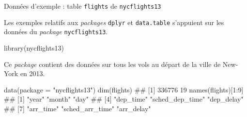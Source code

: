 \documentclass[12pt,handout,ignorenonframetext,]{beamer}
\newenvironment{Shaded}{}{}
\newcommand{\KeywordTok}[1]{\textcolor[rgb]{0.00,0.00,1.00}{{#1}}}
\newcommand{\DataTypeTok}[1]{{#1}}
\newcommand{\DecValTok}[1]{{#1}}
\newcommand{\StringTok}[1]{\textcolor[rgb]{0.00,0.50,0.50}{{#1}}}
\newcommand{\NormalTok}[1]{{#1}}
\renewenvironment{Shaded}{\begin{snugshade}}{\end{snugshade}}
\begin{document}
\begin{frame}[fragile]{\large Données d'exemple : table \texttt{flights}
de \texttt{nycflights13}}

Les exemples relatifs aux \emph{packages} \texttt{dplyr} et
\texttt{data.table} s'appuient sur les données du \emph{package}
\texttt{nycflights13}.

\begin{Shaded}
\begin{Highlighting}[]
\KeywordTok{library}\NormalTok{(nycflights13)}
\end{Highlighting}
\end{Shaded}

\pause Ce \emph{package} contient des données sur tous les vols au
départ de la ville de New-York en 2013.

\small

\begin{Shaded}
\begin{Highlighting}[]
\KeywordTok{data}\NormalTok{(}\DataTypeTok{package =} \StringTok{"nycflights13"}\NormalTok{)}
\KeywordTok{dim}\NormalTok{(flights)}
  \NormalTok{## [1] 336776     19}
\KeywordTok{names}\NormalTok{(flights)[}\DecValTok{1}\NormalTok{:}\DecValTok{9}\NormalTok{]}
  \NormalTok{## [1] "year"           "month"          "day"           }
  \NormalTok{## [4] "dep_time"       "sched_dep_time" "dep_delay"     }
  \NormalTok{## [7] "arr_time"       "sched_arr_time" "arr_delay"}
\end{Highlighting}
\end{Shaded}

\end{frame}
\end{document}

